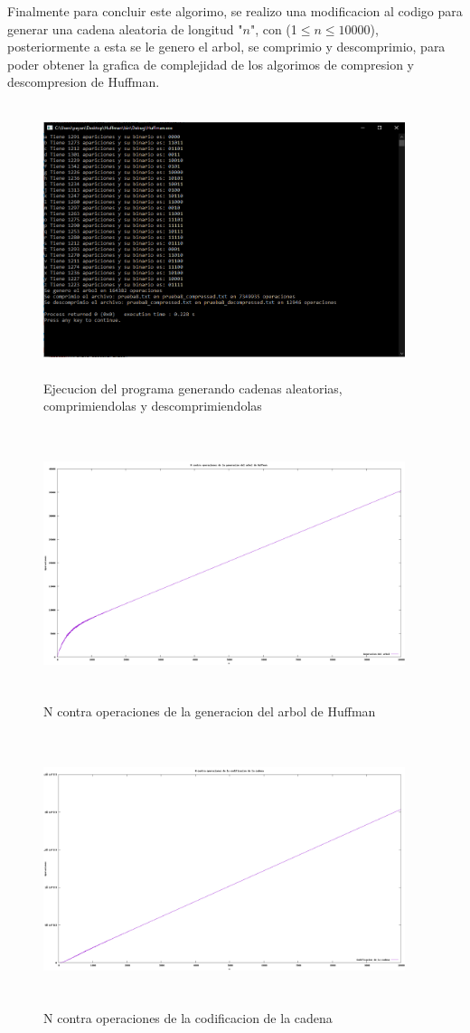 \documentclass[spanish]{article}
\begin{document}
	Finalmente para concluir este algorimo, se realizo una modificacion al codigo para generar una cadena aleatoria de longitud "$n$", con (1$\leq n\leq 10000$), posteriormente a esta se le genero el arbol, se comprimio y descomprimio, para poder obtener la grafica de complejidad de los algorimos de compresion y descompresion de Huffman.
	\begin{figure}[H]
		\centering
		\includegraphics[width=400px,height=300px]{captura47}
		\caption{Ejecucion del programa generando cadenas aleatorias, comprimiendolas y descomprimiendolas}
	\end{figure}
	\begin{figure}[H]
		\centering
		\includegraphics[width=400px,height=300px]{grafica1}
		\caption{N contra operaciones de la generacion del arbol de Huffman}
	\end{figure}
	\begin{figure}[H]
		\centering
		\includegraphics[width=400px,height=300px]{grafica2}
		\caption{N contra operaciones de la codificacion de la cadena}
	\end{figure}
\end{document}
